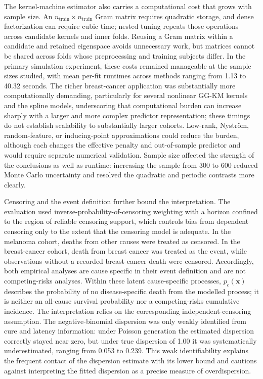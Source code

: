 The kernel-machine estimator also carries a computational cost that grows with sample size. An
$n_{\mathrm{train}}\times n_{\mathrm{train}}$ Gram matrix requires quadratic storage, and dense
factorization can require cubic time; nested tuning repeats those operations across candidate kernels and
inner folds. Reusing a Gram matrix within a candidate and retained eigenspace avoids unnecessary work, but
matrices cannot be shared across folds whose preprocessing and training subjects differ. In the primary
simulation experiment, these costs remained manageable at the sample sizes studied, with mean per-fit
runtimes across methods ranging from 1.13 to 40.32 seconds. The richer breast-cancer application was
substantially more computationally demanding, particularly for several nonlinear GG-KM kernels and the
spline models, underscoring that computational burden can increase sharply with a larger and more complex
predictor representation; these timings do not establish scalability to substantially larger cohorts.
Low-rank, Nystr\"om, random-feature, or inducing-point approximations could reduce the burden, although each
changes the effective penalty and out-of-sample predictor and would require separate numerical validation.
Sample size affected the strength of the conclusions as well as runtime: increasing the sample from 300 to
600 reduced Monte Carlo uncertainty and resolved the quadratic and periodic contrasts more clearly.

Censoring and the event definition further bound the interpretation. The evaluation used
inverse-probability-of-censoring weighting with a horizon confined to the region of reliable censoring
support, which controls bias from dependent censoring only to the extent that the censoring model is
adequate. In the melanoma cohort, deaths from other causes were treated as censored. In the breast-cancer
cohort, death from breast cancer was treated as the event, while observations without a recorded
breast-cancer death were censored. Accordingly, both empirical analyses are cause specific in their event
definition and are not competing-risks analyses. Within these latent cause-specific processes,
$p_c(\bm{x})$ describes the probability of no disease-specific death from the modelled process; it is
neither an all-cause survival probability nor a competing-risks cumulative incidence. The interpretation
relies on the corresponding independent-censoring assumption. The negative-binomial dispersion was only
weakly identified from cure and latency information: under Poisson generation the estimated dispersion
correctly stayed near zero, but under true dispersion of 1.00 it was systematically underestimated, ranging
from 0.053 to 0.239. This weak identifiability explains the frequent contact of the dispersion estimate with
its lower bound and cautions against interpreting the fitted dispersion as a precise measure of
overdispersion.

